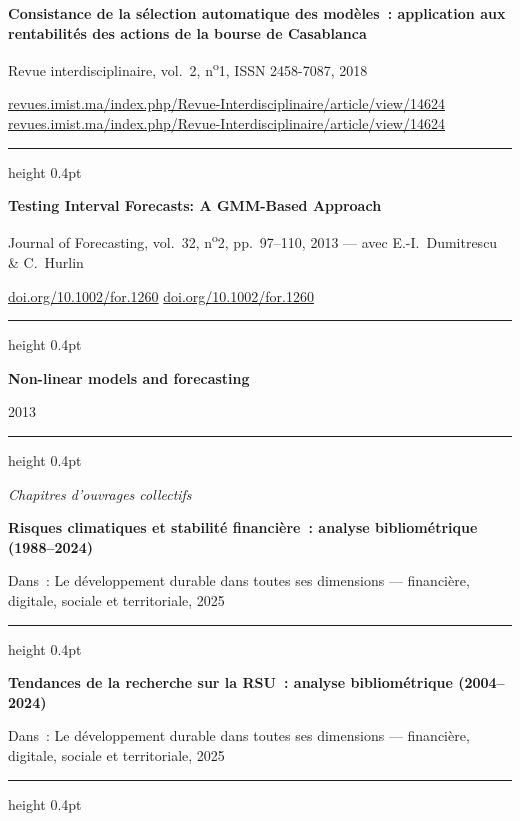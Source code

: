 \documentclass[10.5pt,a4paper]{article}
\newcommand{\cvsubsection}[1]{%
  \vspace{9pt}%
  {\itshape\fontsize{12.5}{14}\selectfont\color{inksoft}#1}\par
  \vspace{5pt}
}
\newcommand{\pub}[3]{%
  \vspace{3pt}
  {\fontsize{9.8}{12}\selectfont\bfseries\color{navy} #1}\par
  \vspace{1pt}
  {\sffamily\fontsize{8.3}{11}\selectfont\color{textsoft} #2}\par
  \def\tmp{#3}\ifx\tmp\empty\else
  {\sffamily\fontsize{8.3}{11}\selectfont\color{gold} #3}\par
  \fi
  \vspace{4pt}
  {\color{rulecolor}\hrule height 0.4pt}
  \vspace{7pt}
}
\begin{document}
\pub{Consistance de la sélection automatique des modèles~: application aux rentabilités des actions de la bourse de Casablanca}
{Revue interdisciplinaire, vol.\ 2, n\textsuperscript{o}1, ISSN 2458-7087, 2018}
{\href{https://revues.imist.ma/index.php/Revue-Interdisciplinaire/article/view/14624}{revues.imist.ma/index.php/Revue-Interdisciplinaire/article/view/14624}}

\pub{Testing Interval Forecasts: A GMM-Based Approach}
{Journal of Forecasting, vol.\ 32, n\textsuperscript{o}2, pp.\ 97--110, 2013 --- avec E.-I.\ Dumitrescu \& C.\ Hurlin}
{\href{https://doi.org/10.1002/for.1260}{doi.org/10.1002/for.1260}}

\pub{Non-linear models and forecasting}
{2013}
{}

\cvsubsection{Chapitres d'ouvrages collectifs}

\pub{Risques climatiques et stabilité financière~: analyse bibliométrique (1988--2024)}
{Dans~: Le développement durable dans toutes ses dimensions --- financière, digitale, sociale et territoriale, 2025}
{}

\pub{Tendances de la recherche sur la RSU~: analyse bibliométrique (2004--2024)}
{Dans~: Le développement durable dans toutes ses dimensions --- financière, digitale, sociale et territoriale, 2025}
{}
\end{document}
